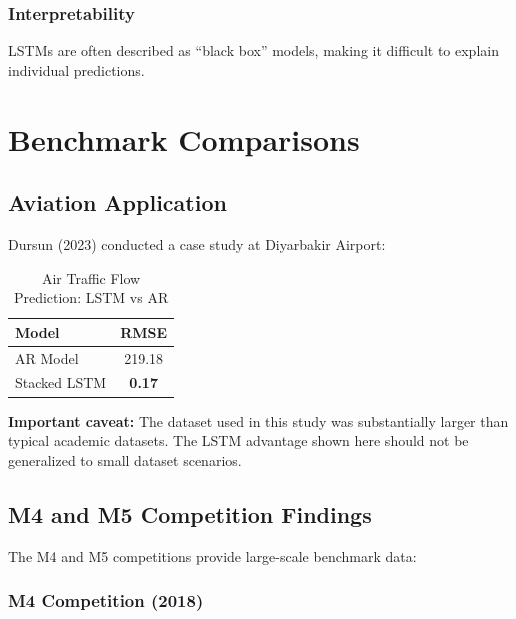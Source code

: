 \documentclass[12pt,a4paper]{article}
\begin{document}
\subsubsection{Interpretability}

LSTMs are often described as ``black box'' models, making it difficult to explain individual predictions.


\section{Benchmark Comparisons}

\subsection{Aviation Application}

Dursun (2023) \cite{dursun2023air} conducted a case study at Diyarbakir Airport:

\begin{table}[htbp]
\centering
\caption{Air Traffic Flow Prediction: LSTM vs AR}
\label{tab:aviation_benchmark}
\begin{tabular}{|l|c|}
\hline
\textbf{Model} & \textbf{RMSE} \\
\hline
AR Model & 219.18 \\
Stacked LSTM & \textbf{0.17} \\
\hline
\end{tabular}
\end{table}

\textbf{Important caveat:} The dataset used in this study was substantially larger than typical academic datasets. The LSTM advantage shown here should not be generalized to small dataset scenarios.

\subsection{M4 and M5 Competition Findings}

The M4 and M5 competitions provide large-scale benchmark data:

\subsubsection{M4 Competition (2018)}
\end{document}
